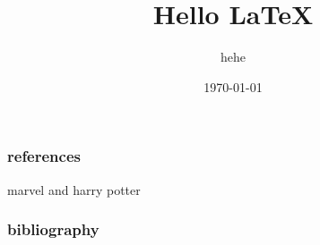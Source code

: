 \documentclass{beamer}
\begin{document}
	\begin{frame}
	\title{Hello \LaTeX{}}
	\date{\today}
	\subtitle{hehe}
	\maketitle
	\end{frame}
	\begin{frame}[allowframebreaks]
	\frametitle{references}
	marvel\cite{spidey} and harry potter\cite{hag}
	\end{frame}
	\begin{frame}[allowframebreaks]
	\frametitle{bibliography}
	\nocite{*}
	\printbibliography
	\end{frame}
\end{document}
